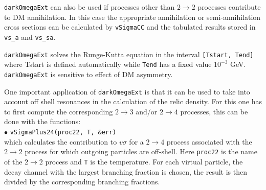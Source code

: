\documentclass[12pt,a4paper]{article}
\begin{document}
 {\tt darkOmegaExt}   can also be used 
if  processes other than $ 2 \to 2$ processes contribute  to DM  annihilation. In this case the appropriate annihilation or  semi-annihilation
cross sections can be calculated by {\tt vSigmaCC} and the tabulated results stored in \verb|vs_a| and \verb|vs_sa|. 



 {\tt darkOmegaExt} solves  the Runge-Kutta equation in the interval {\tt [Tstart, Tend]} 
 where Tstart is defined automatically while {\tt Tend} has a fixed
value $10^{-3}$ GeV. {\tt darkOmegaExt} is sensitive to effect of DM
asymmetry.


One important application of   {\tt darkOmegaExt} is that it can be used to take into account off shell resonances in the calculation of the relic density.
For this one has to first compute the corresponding $2\to 3$ and/or $2\to 4$ processes, this can be done with the functions:\\

\noindent
$\bullet$ \verb|vSigmaPlus24(proc22, T, &err)|\\
which calculates the contribution to $v\sigma$ for a $2\to 4$ process  associated with the  $2\to2$ process  for which outgoing particles are off-shell. 
Here {\tt proc22} is the name of the $2\to2$ process and {\tt T} is the temperature.
For each virtual particle, the decay channel with the largest branching fraction is chosen, the result is then divided by the corresponding branching fractions.
\end{document}

